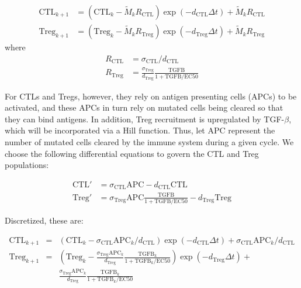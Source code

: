 \documentclass{article}
\begin{document}
\begin{align*}
\text{CTL}_{k+1} & =\left (\text{CTL}_k-\tilde{M}_kR_{\text{CTL}}\right )\exp(- d_{\text{CTL}}\Delta t) + \tilde{M}_kR_{\text{CTL}}\\
\text{Treg}_{k+1} & =\left (\text{Treg}_k-\tilde{M}_kR_{\text{Treg}}\right )\exp(-d_{\text{Treg}}\Delta t)+\tilde{M}_kR_{\text{Treg}}
\end{align*}
where
\begin{align*}
R_{\text{CTL}} &= \sigma_{\text{CTL}}/d_{\text{CTL}}\\
R_{\text{Treg}} &=\frac{\sigma_{\text{Treg}}}{d_{\text{Treg}}} \frac{\text{TGFB}}{1+\text{TGFB}/\text{EC50}}
\end{align*}

For CTLs and Tregs, however, they rely on antigen presenting cells (APCs) to be activated, and these APCs in turn rely on mutated cells being cleared so that they can bind antigens.
In addition, Treg recruitment is upregulated by TGF-$\beta$, which will be incorporated via a Hill function.
Thus, let $\text{APC}$ represent the number of mutated cells cleared by the immune system during a given cycle.
We choose the following differential equations to govern the CTL and Treg populations:

\begin{align*}
\text{CTL}' & = \sigma_{\text{CTL}}\text{APC} - d_{\text{CTL}}\text{CTL} \\
\text{Treg}' & = \sigma_{\text{Treg}}\text{APC} \frac{\text{TGFB}}{1+\text{TGFB}/\text{EC50}}- d_{\text{Treg}}\text{Treg}
\end{align*}

Discretized, these are:

\begin{align*}
\text{CTL}_{k+1} & = & \left (\text{CTL}_k-\sigma_{\text{CTL}}\text{APC}_k/d_{\text{CTL}}\right )\exp(- d_{\text{CTL}}\Delta t) + \sigma_{\text{CTL}}\text{APC}_k/d_{\text{CTL}}\\
\text{Treg}_{k+1} & = & \left (\text{Treg}_k-\frac{\sigma_{\text{Treg}}\text{APC}_k}{d_{\text{Treg}}} \frac{\text{TGFB}_k}{1+\text{TGFB}_k/\text{EC50}}\right )\exp(-d_{\text{Treg}}\Delta t)+\\
& & \frac{\sigma_{\text{Treg}}\text{APC}_k}{d_{\text{Treg}}} \frac{\text{TGFB}_k}{1+\text{TGFB}_k/\text{EC50}}
\end{align*}
\end{document}
